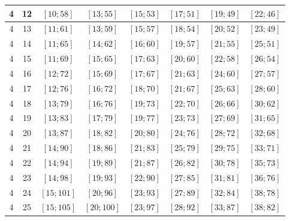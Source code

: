 \documentclass[a4paper,12pt]{article}
\begin{document}
\begin{center}
{\begin{longtable}[H]{|c|c|c|c|c|c|c|c|}
4 &  12 &  $\left[ 10; 58\right]$ &  $\left[ 13; 55\right]$ &  $\left[ 15; 53\right]$ &  $\left[ 17; 51\right]$ &  $\left[ 19; 49\right]$ &  $\left[ 22; 46\right]$ \tabularnewline \hline
4 &  13 &  $\left[ 11; 61\right]$ &  $\left[ 13; 59\right]$ &  $\left[ 15; 57\right]$ &  $\left[ 18; 54\right]$ &  $\left[ 20; 52\right]$ &  $\left[ 23; 49\right]$ \tabularnewline \hline
4 &  14 &  $\left[ 11; 65\right]$ &  $\left[ 14; 62\right]$ &  $\left[ 16; 60\right]$ &  $\left[ 19; 57\right]$ &  $\left[ 21; 55\right]$ &  $\left[ 25; 51\right]$ \tabularnewline \hline
4 &  15 &  $\left[ 11; 69\right]$ &  $\left[ 15; 65\right]$ &  $\left[ 17; 63\right]$ &  $\left[ 20; 60\right]$ &  $\left[ 22; 58\right]$ &  $\left[ 26; 54\right]$ \tabularnewline \hline
4 &  16 &  $\left[ 12; 72\right]$ &  $\left[ 15; 69\right]$ &  $\left[ 17; 67\right]$ &  $\left[ 21; 63\right]$ &  $\left[ 24; 60\right]$ &  $\left[ 27; 57\right]$ \tabularnewline \hline
4 &  17 &  $\left[ 12; 76\right]$ &  $\left[ 16; 72\right]$ &  $\left[ 18; 70\right]$ &  $\left[ 21; 67\right]$ &  $\left[ 25; 63\right]$ &  $\left[ 28; 60\right]$ \tabularnewline \hline
4 &  18 &  $\left[ 13; 79\right]$ &  $\left[ 16; 76\right]$ &  $\left[ 19; 73\right]$ &  $\left[ 22; 70\right]$ &  $\left[ 26; 66\right]$ &  $\left[ 30; 62\right]$ \tabularnewline \hline
4 &  19 &  $\left[ 13; 83\right]$ &  $\left[ 17; 79\right]$ &  $\left[ 19; 77\right]$ &  $\left[ 23; 73\right]$ &  $\left[ 27; 69\right]$ &  $\left[ 31; 65\right]$ \tabularnewline \hline
4 &  20 &  $\left[ 13; 87\right]$ &  $\left[ 18; 82\right]$ &  $\left[ 20; 80\right]$ &  $\left[ 24; 76\right]$ &  $\left[ 28; 72\right]$ &  $\left[ 32; 68\right]$ \tabularnewline \hline
4 &  21 &  $\left[ 14; 90\right]$ &  $\left[ 18; 86\right]$ &  $\left[ 21; 83\right]$ &  $\left[ 25; 79\right]$ &  $\left[ 29; 75\right]$ &  $\left[ 33; 71\right]$ \tabularnewline \hline
4 &  22 &  $\left[ 14; 94\right]$ &  $\left[ 19; 89\right]$ &  $\left[ 21; 87\right]$ &  $\left[ 26; 82\right]$ &  $\left[ 30; 78\right]$ &  $\left[ 35; 73\right]$ \tabularnewline \hline
4 &  23 &  $\left[ 14; 98\right]$ &  $\left[ 19; 93\right]$ &  $\left[ 22; 90\right]$ &  $\left[ 27; 85\right]$ &  $\left[ 31; 81\right]$ &  $\left[ 36; 76\right]$ \tabularnewline \hline
4 &  24 &  $\left[ 15; 101\right]$ &  $\left[ 20; 96\right]$ &  $\left[ 23; 93\right]$ &  $\left[ 27; 89\right]$ &  $\left[ 32; 84\right]$ &  $\left[ 38; 78\right]$ \tabularnewline \hline
4 &  25 &  $\left[ 15; 105\right]$ &  $\left[ 20; 100\right]$ &  $\left[ 23; 97\right]$ &  $\left[ 28; 92\right]$ &  $\left[ 33; 87\right]$ &  $\left[ 38; 82\right]$ \tabularnewline \hline

\end{longtable}}
\end{center}
\end{document}
